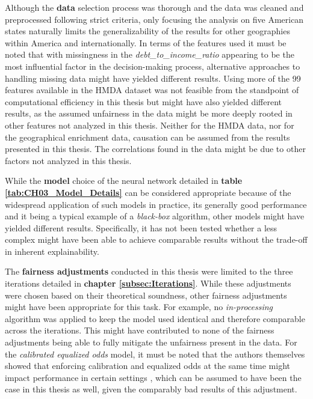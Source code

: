 Although the \textbf{data} selection process was thorough and the data was cleaned and preprocessed following strict criteria, only focusing the analysis on five American states naturally limits the generalizability of the results for other geographies within America and internationally.
In terms of the features used it must be noted that with missingness in the \textit{debt\_to\_income\_ratio} appearing to be the most influential factor in the decision-making process, alternative approaches to handling missing data might have yielded different results.
Using more of the 99 features available in the HMDA dataset was not feasible from the standpoint of computational efficiency in this thesis but might have also yielded different results, as the assumed unfairness in the data might be more deeply rooted in other features not analyzed in this thesis.
Neither for the HMDA data, nor for the geographical enrichment data, causation can be assumed from the results presented in this thesis. The correlations found in the data might be due to other factors not analyzed in this thesis.

While the \textbf{model} choice of the neural network detailed in \textbf{table \ref{tab:CH03_Model_Details}} can be considered appropriate because of the widespread application of such models in practice, its generally good performance and it being a typical example of a \textit{black-box} algorithm, other models might have yielded different results.
Specifically, it has not been tested whether a less complex might have been able to achieve comparable results without the trade-off in inherent explainability.

The \textbf{fairness adjustments} conducted in this thesis were limited to the three iterations detailed in \textbf{chapter \ref{subsec:Iterations}}. While these adjustments were chosen based on their theoretical soundness, other fairness adjustments might have been appropriate for this task.
For example, no \textit{in-processing} algorithm was applied to keep the model used identical and therefore comparable across the iterations. This might have contributed to none of the fairness adjustments being able to fully mitigate the unfairness present in the data.
For the \textit{calibrated equalized odds} model, it must be noted that the authors themselves showed that enforcing calibration and equalized odds at the same time might impact performance in certain settings \parencite{Pleiss2017}, which can be assumed to have been the case in this thesis as well, given the comparably bad results of this adjustment.

